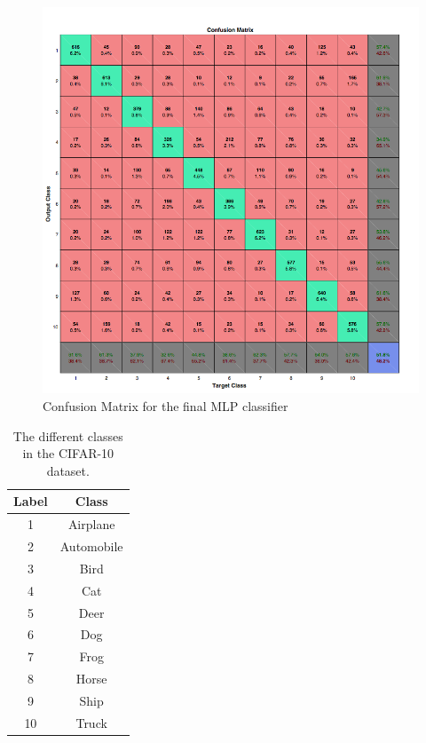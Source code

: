 \begin{figure}[h!]
   \centering
   \includegraphics[width=\textwidth]{images/Confusion_Matrix}
   \caption{Confusion Matrix for the final MLP classifier }
   \label{fig:Conf_Matrix}

\end{figure}

\begin{table}[h]
\begin{center}
 \begin{tabular}{||c | c||}
 \hline
 \textbf{Label} & \textbf{Class} \\ [0.5ex]
 \hline
 1& Airplane\\
 2& Automobile \\
 3& Bird\\
 4& Cat\\
 5& Deer\\
 6& Dog\\
 7& Frog\\
 8& Horse\\
 9& Ship\\
 10& Truck\\[1ex]
 \hline

\end{tabular}
\caption{The different classes in the CIFAR-10 dataset.}
\label{Tab:Classes}
\end{center}
\end{table}

